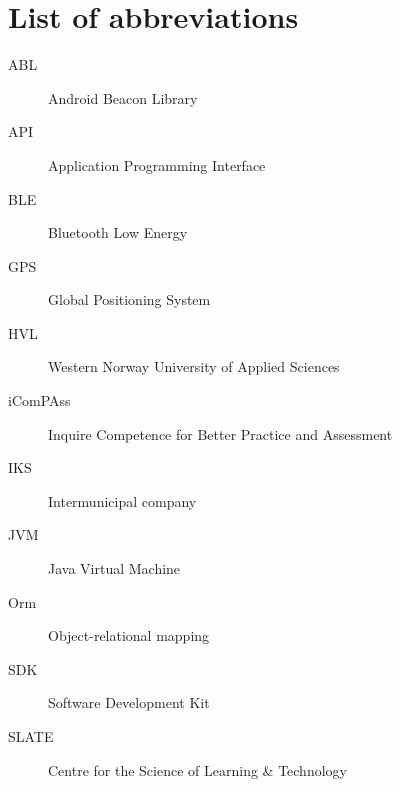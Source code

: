 \documentclass[../Main/thesis.tex]{subfiles}
\begin{document}
\chapter*{List of abbreviations}
\begin{description}
\item[ABL] Android Beacon Library
\item[API] Application Programming Interface
\item[BLE] Bluetooth Low Energy
\item[GPS] Global Positioning System
\item[HVL] Western Norway University of Applied Sciences
\item[iComPAss] Inquire Competence for Better Practice and Assessment
\item[IKS] Intermunicipal company
\item[JVM] Java Virtual Machine
\item[Orm] Object-relational mapping 
\item[SDK] Software Development Kit
\item[SLATE] Centre for the Science of Learning \& Technology
\end{description}

\blankpage
\end{document}
